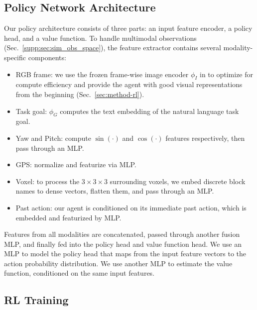 

\subsection{Policy Network Architecture}
Our policy architecture consists of three parts: an input feature encoder, a policy head, and a value function. 
To handle multimodal observations (Sec.~\ref{supp:sec:sim_obs_space}), the feature extractor contains several modality-specific components: 

\begin{itemize}
    \item RGB frame: we use the frozen frame-wise image encoder $\phi_I$ in \mineclip to optimize for compute efficiency and provide the agent with good visual representations from the beginning (Sec.~\ref{sec:method-rl}).
    \item Task goal: $\phi_G$ computes the text embedding of the natural language task goal. 
    \item Yaw and Pitch: compute $\sin(\cdot)$ and $\cos(\cdot)$ features respectively, then pass through an MLP. 
    \item GPS: normalize and featurize via MLP.
    \item Voxel: to process the $3 \times 3 \times 3$ surrounding voxels, we embed discrete block names to dense vectors, flatten them, and pass through an MLP.
    \item Past action: our agent is conditioned on its immediate past action, which is embedded and featurized by MLP. 
\end{itemize}

Features from all modalities are concatenated, passed through another fusion MLP, and finally fed into the policy head and value function head. 
We use an MLP to model the policy head that maps from the input feature vectors to the action probability distribution. We use another MLP to estimate the value function, conditioned on the same input features. 

\subsection{RL Training}
\label{sec:appendix_rl_training}

